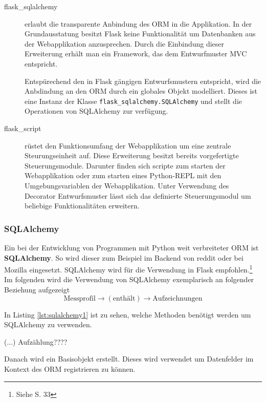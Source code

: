   \begin{description}
   \item [flask\_sqlalchemy] erlaubt die transparente Anbindung des ORM in die Applikation. In der Grundausstatung besitzt Flask keine Funktionalität um Datenbanken aus der Webapplikation anzusprechen. Durch die Einbindung dieser Erweiterung erhält man ein Framework, das dem Entwurfmuster MVC entspricht.
   
   Entspürechend den in Flask gängigen Entwurfsmustern entspricht, wird die Anbdindung an den ORM durch ein globales Objekt modelliert. Dieses ist eine Instanz der Klasse \texttt{flask\_sqlalchemy.SQLAlchemy} und stellt die Operationen von SQLAlchemy zur verfügung.
   
   \item [flask\_script] rüstet den Funktionsumfang der Webapplikation um eine zentrale Steurungseinheit auf. Diese Erweiterung besitzt bereits vorgefertigte Steuerungsmodule. Darunter finden sich scripte  zum starten der Webapplikation oder zum starten eines Python-REPL mit den Umgebungsvariablen der Webapplikation. Unter Verwendung des Decorator Entwurfsmuster lässt sich das definierte Steuerungsmodul um beliebige Funktionalitäten erweitern.
   
  \end{description}

    

    \subsubsection{SQLAlchemy}
    
    Ein bei der Entwicklung von Programmen mit Python weit verbreiteter ORM ist \textbf{SQLAlchemy}. So wird dieser zum Beispiel im Backend von reddit oder bei Mozilla eingesetzt. SQLAlchemy wird für die Verwendung in Flask empfohlen.\footnote{Siehe \cite{openingtheflask} S. 33} \\
    
    
    Im folgenden wird die Verwendung von SQLAlchemy exemplarisch an folgender  Beziehung aufgezeigt \[ \mbox{Messprofil} \to (\mbox{enthält}) \to \mbox{Aufzeichnungen}\] 


    In Listing \ref{lst:sqlalchemy1} ist zu sehen, welche Methoden benötigt werden um SQLAlchemy zu verwenden.
    
    (...)  Aufzählung????
    
    Danach wird ein Basisobjekt erstellt. Dieses wird verwendet um Datenfelder im Kontext des ORM registrieren zu können. 
    
